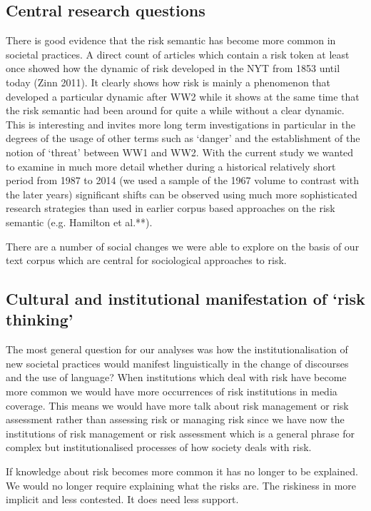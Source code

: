 \subsection{Central research questions}

There is good evidence that the risk semantic has become more common in societal practices. A direct count of articles which contain a risk token at least once showed how the dynamic of risk developed in the NYT from 1853 until today (Zinn 2011). It clearly shows how risk is mainly a phenomenon that developed a particular dynamic after WW2 while it shows at the same time that the risk semantic had been around for quite a while without a clear dynamic. This is interesting and invites more long term investigations in particular in the degrees of the usage of other terms such as `danger' and the establishment of the notion of `threat' between WW1 and WW2.
With the current study we wanted to examine in much more detail whether during a historical relatively short period from 1987 to 2014 (we used a sample of the 1967 volume to contrast with the later years) significant shifts can be observed using much more sophisticated research strategies than used in earlier corpus based approaches on the risk semantic (e.g. Hamilton et al.**).

There are a number of social changes we were able to explore on the basis of our text corpus which are central for sociological approaches to risk. 

\subsection{Cultural and institutional manifestation of `risk thinking'}

The most general question for our analyses was how the institutionalisation of new societal practices would manifest linguistically in the change of discourses and the use of language? 
When institutions which deal with risk have become more common we would have more occurrences of risk institutions in media coverage. This means we would have more talk about risk management or risk assessment rather than assessing risk or managing risk since we have now the institutions of risk management or risk assessment which is a general phrase for complex but institutionalised processes of how society deals with risk.

If knowledge about risk becomes more common it has no longer to be explained. We would no longer require explaining what the risks are. The riskiness in more implicit and less contested. It does need less support.

